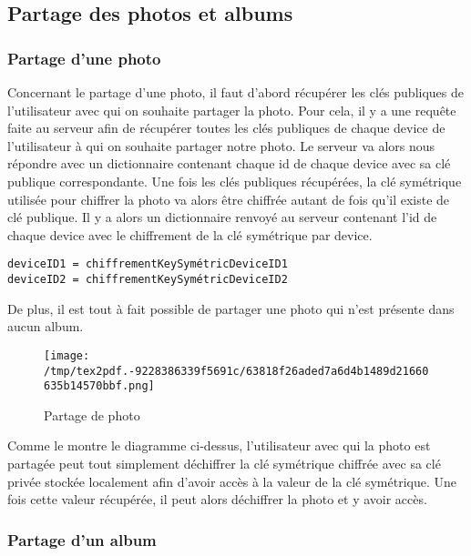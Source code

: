 \documentclass[
  11pt,
  paper=a4,
  ,captions=tableheading
]{scrartcl}
\begin{document}
\hypertarget{partage-des-photos-et-albums}{%
\subsection{Partage des photos et
albums}\label{partage-des-photos-et-albums}}

\hypertarget{partage-dune-photo}{%
\subsubsection{Partage d’une photo}\label{partage-dune-photo}}

Concernant le partage d’une photo, il faut d’abord récupérer les clés
publiques de l’utilisateur avec qui on souhaite partager la photo. Pour
cela, il y a une requête faite au serveur afin de récupérer toutes les
clés publiques de chaque device de l’utilisateur à qui on souhaite
partager notre photo. Le serveur va alors nous répondre avec un
dictionnaire contenant chaque id de chaque device avec sa clé publique
correspondante. Une fois les clés publiques récupérées, la clé
symétrique utilisée pour chiffrer la photo va alors être chiffrée autant
de fois qu’il existe de clé publique. Il y a alors un dictionnaire
renvoyé au serveur contenant l’id de chaque device avec le chiffrement
de la clé symétrique par device.

\begin{verbatim}
deviceID1 = chiffrementKeySymétricDeviceID1
deviceID2 = chiffrementKeySymétricDeviceID2
\end{verbatim}

De plus, il est tout à fait possible de partager une photo qui n’est
présente dans aucun album.

\begin{figure}
\centering
\texttt{[image: /tmp/tex2pdf.-9228386339f5691c/63818f26aded7a6d4b1489d21660635b14570bbf.png]}
\caption{Partage de photo}
\end{figure}

Comme le montre le diagramme ci-dessus, l’utilisateur avec qui la photo
est partagée peut tout simplement déchiffrer la clé symétrique chiffrée
avec sa clé privée stockée localement afin d’avoir accès à la valeur de
la clé symétrique. Une fois cette valeur récupérée, il peut alors
déchiffrer la photo et y avoir accès.

\hypertarget{partage-dun-album}{%
\subsubsection{Partage d’un album}\label{partage-dun-album}}
\end{document}
